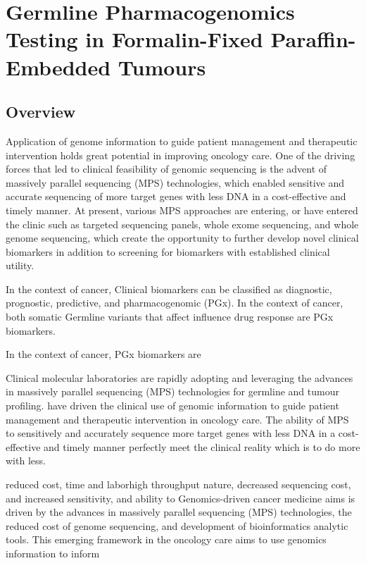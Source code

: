 
\chapter{Germline Pharmacogenomics Testing in Formalin-Fixed Paraffin-Embedded Tumours}
\label{ch:GermlinePharmacogenomicsTestinginFormalin-FixedParaffin-EmbeddedTumours}

\section{Overview}
\label{sec:Overview}

Application of genome information to guide patient management and therapeutic intervention holds great potential in improving oncology care. One of the driving forces that led to clinical feasibility of genomic sequencing is the advent of massively parallel sequencing (MPS) technologies, which enabled sensitive and accurate sequencing of more target genes with less DNA in a cost-effective and timely manner. At present, various MPS approaches are entering, or have entered the clinic such as targeted sequencing panels, whole exome sequencing, and whole genome sequencing, which create the opportunity to further develop novel clinical biomarkers in addition to screening for biomarkers with established clinical utility.

In the context of cancer,
Clinical biomarkers can be classified as diagnostic, prognostic, predictive, and pharmacogenomic (PGx). In the context of cancer, both somatic Germline variants that affect influence drug response are PGx biomarkers.

In the context of cancer, PGx biomarkers are

Clinical molecular laboratories are rapidly adopting and leveraging the advances in massively parallel sequencing (MPS) technologies for germline and tumour profiling. have driven the clinical use of genomic information to guide patient management and therapeutic intervention in oncology care. The ability of MPS to sensitively and accurately sequence more target genes with less DNA in a cost-effective and timely manner perfectly meet the clinical reality which is to do more with less.

reduced cost, time and laborhigh throughput nature, decreased sequencing cost, and increased sensitivity, and ability to Genomics-driven cancer medicine aims is driven by the advances in massively parallel sequencing (MPS) technologies, the reduced cost of genome sequencing, and development of bioinformatics analytic tools. This emerging framework in the oncology care aims to use genomics information to inform

